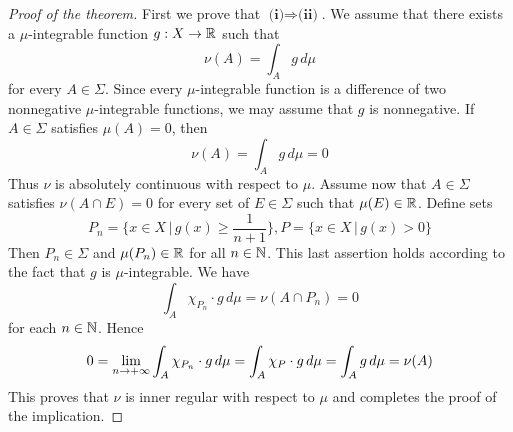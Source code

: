 \begin{proof}[Proof of the theorem]
    First we prove that $\textbf{(i)}\Rightarrow \textbf{(ii)}$. We assume that there exists a $\mu$-integrable function $g:X\rightarrow {\mathbb R}$ such that
    $$\nu(A) = \int_Ag\,d\mu$$
    for every $A\in \Sigma$. Since every $\mu$-integrable function is a difference of two nonnegative $\mu$-integrable functions, we may assume that $g$ is nonnegative. If $A \in \Sigma$ satisfies $\mu(A) = 0$, then
    $$\nu(A) = \int_Ag\,d\mu = 0$$
    Thus $\nu$ is absolutely continuous with respect to $\mu$. Assume now that $A \in \Sigma$ satisfies $\nu(A\cap E) = 0$ for every set of $E \in \Sigma$ such that $\mu(E) \in {\mathbb R}$. Define sets
    $$P_n = \bigg\{x\in X\,\bigg|\,g(x) \geq \frac{1}{n + 1}\bigg\}, P = \bigg\{x\in X\,\bigg|\,g(x) > 0\bigg\}$$
    Then $P_n \in \Sigma$ and $\mu(P_n) \in {\mathbb R}$ for all $n \in {\mathbb N}$. This last assertion holds according to the fact that $g$ is $\mu$-integrable. We have
    $$\int_{A}\chi_{P_n}\cdot g\,d\mu = \nu(A\cap P_n) = 0$$
    for each $n \in {\mathbb N}$. Hence
    $$0 = \lim_{n\rightarrow +\infty}\int_A\chi_{P_n}\cdot g\,d\mu = \int_A\chi_P\cdot g\,d\mu = \int_Ag\,d\mu = \nu(A)$$
    This proves that $\nu$ is inner regular with respect to $\mu$ and completes the proof of the implication.


\end{proof}
